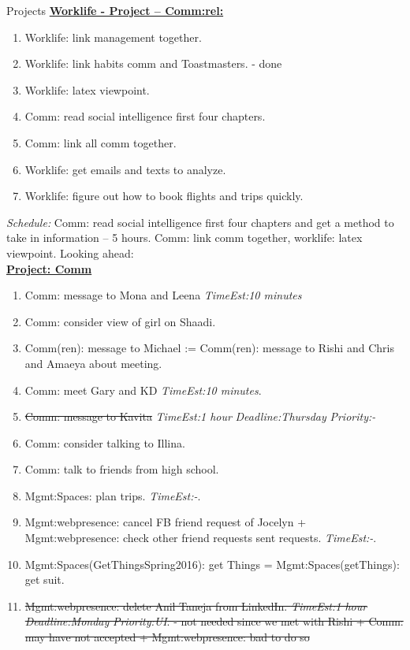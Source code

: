 \documentclass[serif, mathserif, final]{beamer}
\newcommand{\doneTask}[1]{\tiny \item \tiny \sout{#1}}
\newcommand{\te}[1]{\textit{TimeEst:}\textit{#1}}
\newcommand{\dl}[1]{\textit{Deadline:}\textit{#1}}
\newcommand{\pr}[1]{\textit{Priority:}\textit{#1}}
\begin{document}
\begin{frame}
\begin{columns}
\begin{column}{0.5\textwidth}
\begin{block}{Projects}
{\underline{\textbf{Worklife - Project – Comm:rel:}}}
\begin{enumerate} 
  \tiny \item \tiny Worklife: link management together.  
\item \tiny Worklife: link habits comm and Toastmasters. - done
\item \tiny Worklife: latex viewpoint. 
\item \tiny Comm: read social intelligence first four chapters.
\item \tiny Comm: link all comm together.
\item \tiny Worklife: get emails and texts to analyze. 
\item \tiny Worklife: figure out how to book flights and trips quickly. 
\end{enumerate}
\textit{Schedule:} Comm: read social intelligence first four chapters
and get a method to take in information – 5 hours. Comm: link comm together, worklife: latex viewpoint. Looking ahead:  \\
{\underline{\textbf{ Project: Comm}}}
\begin{enumerate}
  \tiny \item \tiny Comm: message to Mona and Leena \te{10 minutes} 
\item \tiny Comm: consider view of girl on Shaadi. 
\item \tiny Comm(ren): message to Michael :=  Comm(ren): message to
  Rishi and Chris and Amaeya about meeting. 
\item \tiny Comm: meet Gary and KD \te{10 minutes}.
  \doneTask{Comm: message to Kavita} 
\te{1 hour} \dl{Thursday} \pr{-}
      \item \tiny Comm: consider talking to Illina.
      \item \tiny Comm: talk to friends from high school.
      \item \tiny Mgmt:Spaces: plan trips. \te{-}.
      \item \tiny Mgmt:webpresence: cancel FB friend request of
        Jocelyn + Mgmt:webpresence: check other friend requests
        sent requests. \te{-}.
      \item \tiny Mgmt:Spaces(GetThingsSpring2016): get Things =
        Mgmt:Spaces(getThings): get suit. 
      \doneTask{Mgmt:webpresence: delete Anil Taneja from
        LinkedIn. \te{1 hour} \dl{Monday} \pr{UI}. - not needed since
        we met with Rishi  + Comm: may have not accepted +
        Mgmt:webpresence: bad to do so}




\end{enumerate}
\end{block}
\end{column}
\end{columns}
\end{frame}
\end{document}
